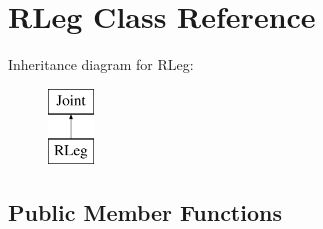 \hypertarget{class_r_leg}{\section{R\-Leg Class Reference}
\label{class_r_leg}
}
Inheritance diagram for R\-Leg\-:\begin{figure}[H]
\begin{center}
\leavevmode
\includegraphics[height=2.000000cm]{class_r_leg}
\end{center}
\end{figure}
\subsection*{Public Member Functions}
